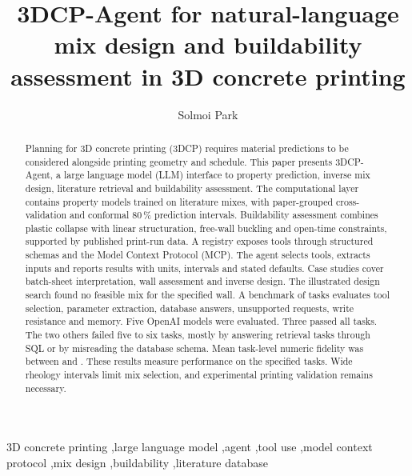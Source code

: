 \documentclass[preprint,12pt]{elsarticle}
\begin{document}
\begin{frontmatter}

\title{3DCP-Agent for natural-language mix design and buildability assessment in 3D concrete printing}

\author[skku]{Solmoi Park}
\address[skku]{School of Civil, Architectural Engineering and Landscape Architecture, Sungkyunkwan University, Suwon, Republic of Korea}

\begin{abstract}
Planning for 3D concrete printing (3DCP) requires material predictions to be considered alongside printing geometry and schedule. This paper presents 3DCP-Agent, a large language model (LLM) interface to property prediction, inverse mix design, literature retrieval and buildability assessment. The computational layer contains \nnModels{} property models trained on \nmixes{} literature mixes, with paper-grouped cross-validation and conformal 80\,\% prediction intervals. Buildability assessment combines plastic collapse with linear structuration, free-wall buckling and open-time constraints, supported by published print-run data. A registry exposes \nnTools{} tools through structured schemas and the Model Context Protocol (MCP). The agent selects tools, extracts inputs and reports results with units, intervals and stated defaults. Case studies cover batch-sheet interpretation, wall assessment and inverse design. The illustrated design search found no feasible mix for the specified wall. A benchmark of \nbenchCxN{} tasks evaluates tool selection, parameter extraction, database answers, unsupported requests, write resistance and memory. Five OpenAI models were evaluated. Three passed all tasks. The two others failed five to six tasks, mostly by answering retrieval tasks through SQL or by misreading the database schema. Mean task-level numeric fidelity was between \nbenchCuFidelity{} and \nbenchCsFidelity{}. These results measure performance on the specified tasks. Wide rheology intervals limit mix selection, and experimental printing validation remains necessary.
\end{abstract}

\begin{keyword}
3D concrete printing \sep large language model \sep agent \sep tool use \sep model context protocol \sep mix design \sep buildability \sep literature database
\end{keyword}
\end{frontmatter}
\end{document}
